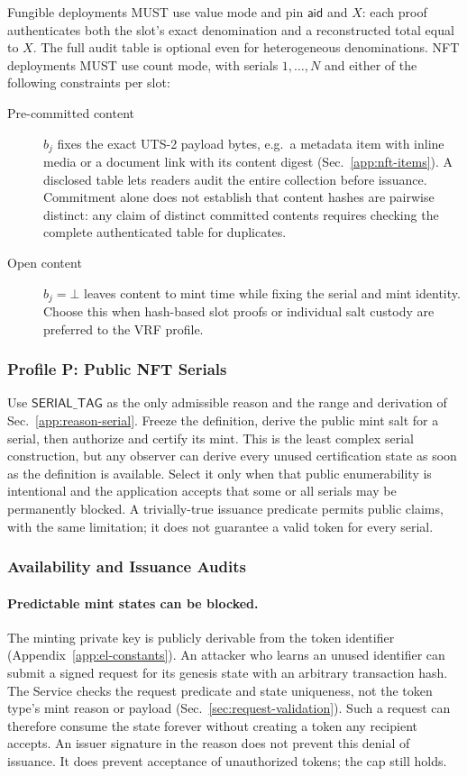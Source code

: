 Fungible deployments MUST use value mode and pin $\mathsf{aid}$ and $X$: each proof authenticates both the slot's exact denomination and a reconstructed total equal to $X$. The full audit table is optional even for heterogeneous denominations. NFT deployments MUST use count mode, with serials $1,\ldots,N$ and either of the following constraints per slot:
\begin{description}
	\item[Pre-committed content] $b_j$ fixes the exact UTS-2 payload bytes, e.g.\ a metadata item with inline media or a document link with its content digest (Sec.~\ref{app:nft-items}). A disclosed table lets readers audit the entire collection before issuance. Commitment alone does not establish that content hashes are pairwise distinct: any claim of distinct committed contents requires checking the complete authenticated table for duplicates.
	\item[Open content] $b_j=\bot$ leaves content to mint time while fixing the serial and mint identity. Choose this when hash-based slot proofs or individual salt custody are preferred to the VRF profile.
\end{description}

\subsubsection{Profile P: Public NFT Serials}\label{app:uts-public-serial}

Use $\mathsf{SERIAL\_TAG}$ as the only admissible reason and the range and derivation of Sec.~\ref{app:reason-serial}. Freeze the definition, derive the public mint salt for a serial, then authorize and certify its mint. This is the least complex serial construction, but any observer can derive every unused certification state as soon as the definition is available. Select it only when that public enumerability is intentional and the application accepts that some or all serials may be permanently blocked. A trivially-true issuance predicate permits public claims, with the same limitation; it does not guarantee a valid token for every serial.

\subsubsection{Availability and Issuance Audits}\label{app:capped-availability}

\paragraph{Predictable mint states can be blocked.} The minting private key is publicly derivable from the token identifier (Appendix~\ref{app:el-constants}). An attacker who learns an unused identifier can submit a signed request for its genesis state with an arbitrary transaction hash. The Service checks the request predicate and state uniqueness, not the token type's mint reason or payload (Sec.~\ref{sec:request-validation}). Such a request can therefore consume the state forever without creating a token any recipient accepts. An issuer signature in the reason does not prevent this denial of issuance. It does prevent acceptance of unauthorized tokens; the cap still holds.


